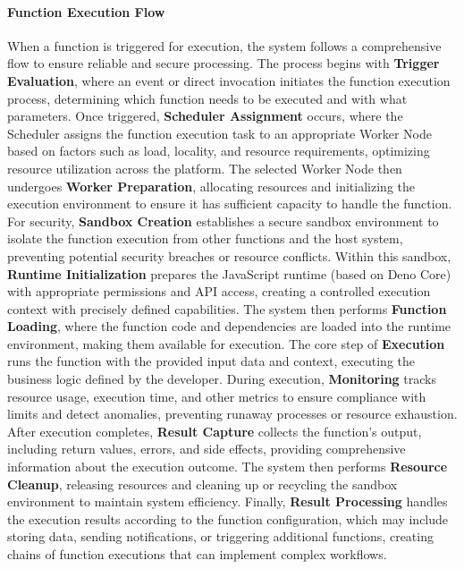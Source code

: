 \documentclass[12pt,a4paper]{article}
\begin{document}
\paragraph{Function Execution Flow}
When a function is triggered for execution, the system follows a comprehensive flow to ensure reliable and secure processing. The process begins with \textbf{Trigger Evaluation}, where an event or direct invocation initiates the function execution process, determining which function needs to be executed and with what parameters. Once triggered, \textbf{Scheduler Assignment} occurs, where the Scheduler assigns the function execution task to an appropriate Worker Node based on factors such as load, locality, and resource requirements, optimizing resource utilization across the platform. The selected Worker Node then undergoes \textbf{Worker Preparation}, allocating resources and initializing the execution environment to ensure it has sufficient capacity to handle the function. For security, \textbf{Sandbox Creation} establishes a secure sandbox environment to isolate the function execution from other functions and the host system, preventing potential security breaches or resource conflicts. Within this sandbox, \textbf{Runtime Initialization} prepares the JavaScript runtime (based on Deno Core) with appropriate permissions and API access, creating a controlled execution context with precisely defined capabilities. The system then performs \textbf{Function Loading}, where the function code and dependencies are loaded into the runtime environment, making them available for execution. The core step of \textbf{Execution} runs the function with the provided input data and context, executing the business logic defined by the developer. During execution, \textbf{Monitoring} tracks resource usage, execution time, and other metrics to ensure compliance with limits and detect anomalies, preventing runaway processes or resource exhaustion. After execution completes, \textbf{Result Capture} collects the function's output, including return values, errors, and side effects, providing comprehensive information about the execution outcome. The system then performs \textbf{Resource Cleanup}, releasing resources and cleaning up or recycling the sandbox environment to maintain system efficiency. Finally, \textbf{Result Processing} handles the execution results according to the function configuration, which may include storing data, sending notifications, or triggering additional functions, creating chains of function executions that can implement complex workflows.
\end{document}
